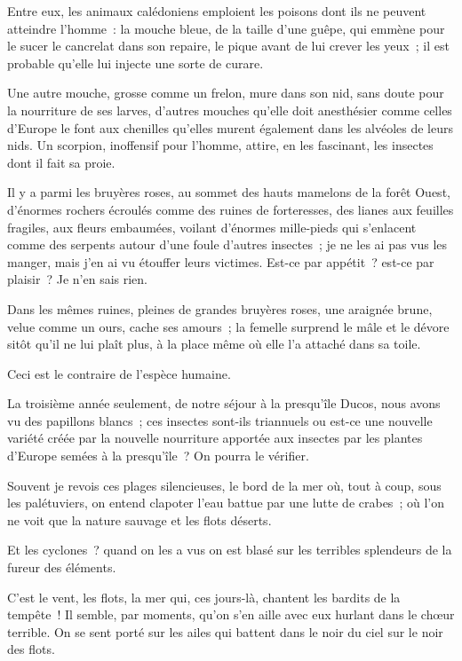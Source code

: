 \documentclass[french,twoside]{book} %
\begin{document}
Entre eux, les animaux calédoniens emploient les poisons dont ils ne peuvent atteindre l’homme : la mouche bleue, de la taille d’une guêpe, qui emmène pour le sucer le cancrelat dans son repaire, le pique avant de lui crever les yeux ; il est probable qu’elle lui injecte une sorte de curare.\par
Une autre mouche, grosse comme un frelon, mure dans son nid, sans doute pour la nourriture de ses larves, d’autres mouches qu’elle doit anesthésier comme celles d’Europe le font aux chenilles qu’elles murent également dans les alvéoles de leurs nids. Un scorpion, inoffensif pour l’homme, attire, en les fascinant, les insectes dont il fait sa proie.\par
Il y a parmi les bruyères roses, au sommet des hauts mamelons de la forêt Ouest, d’énormes rochers écroulés comme des ruines de forteresses, des lianes aux feuilles fragiles, aux fleurs embaumées, voilant d’énormes mille-pieds qui s’enlacent comme des serpents autour d’une foule d’autres insectes ; je ne les ai pas vus les manger,  mais j’en ai vu étouffer leurs victimes. Est-ce par appétit ? est-ce par plaisir ? Je n’en sais rien.\par
Dans les mêmes ruines, pleines de grandes bruyères roses, une araignée brune, velue comme un ours, cache ses amours ; la femelle surprend le mâle et le dévore sitôt qu’il ne lui plaît plus, à la place même où elle l’a attaché dans sa toile.\par
Ceci est le contraire de l’espèce humaine.\par
La troisième année seulement, de notre séjour à la presqu’île Ducos, nous avons vu des papillons blancs ; ces insectes sont-ils triannuels ou est-ce une nouvelle variété créée par la nouvelle nourriture apportée aux insectes par les plantes d’Europe semées à la presqu’île ? On pourra le vérifier.\par
Souvent je revois ces plages silencieuses, le bord de la mer où, tout à coup, sous les palétuviers, on entend clapoter l’eau battue par une lutte de crabes ; où l’on ne voit que la nature sauvage et les flots déserts.\par
Et les cyclones ? quand on les a vus on est blasé sur les terribles splendeurs de la fureur des éléments.\par
C’est le vent, les flots, la mer qui, ces jours-là, chantent les bardits de la tempête ! Il semble, par moments, qu’on s’en aille avec eux hurlant dans le chœur terrible. On se sent porté sur les ailes  qui battent dans le noir du ciel sur le noir des flots.\par
\end{document}
